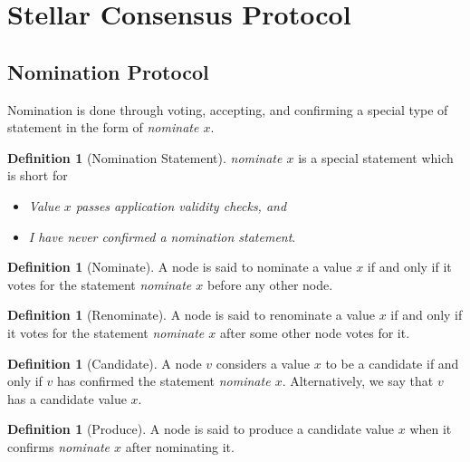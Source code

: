 \documentclass[12pt, psamsfonts]{amsart}
\theoremstyle{definition}
\newtheorem{defn}[thm]{Definition}
\theoremstyle{remark}
\numberwithin{equation}{subsection}
\begin{document}
\newpage
\section{Stellar Consensus Protocol}
\subsection{Nomination Protocol}

Nomination is done through voting, accepting, and confirming a special type of statement in the form of \textit{nominate $x$}.


\begin{defn}[Nomination Statement]
    \textit{nominate $x$} is a special statement which is short for
    \begin{itemize}
        \item
            \textit{Value $x$ passes application validity checks, and}
        \item
            \textit{I have never confirmed a nomination statement}.
    \end{itemize}
\end{defn}

\begin{defn}[Nominate]
    A node is said to nominate a value $x$ if and only if it votes for the statement \textit{nominate $x$} before any other node.
\end{defn}

\begin{defn}[Renominate]
    A node is said to renominate a value $x$ if and only if it votes for the statement \textit{nominate $x$} after some other node votes for it.
\end{defn}

\begin{defn}[Candidate]
    A node $v$ considers a value $x$ to be a candidate if and only if $v$ has confirmed the statement \textit{nominate $x$}.
    Alternatively, we say that $v$ has a candidate value $x$.
\end{defn}

\begin{defn}[Produce]
    A node is said to produce a candidate value $x$ when it confirms \textit{nominate $x$} after nominating it.
\end{defn}

\end{document}
